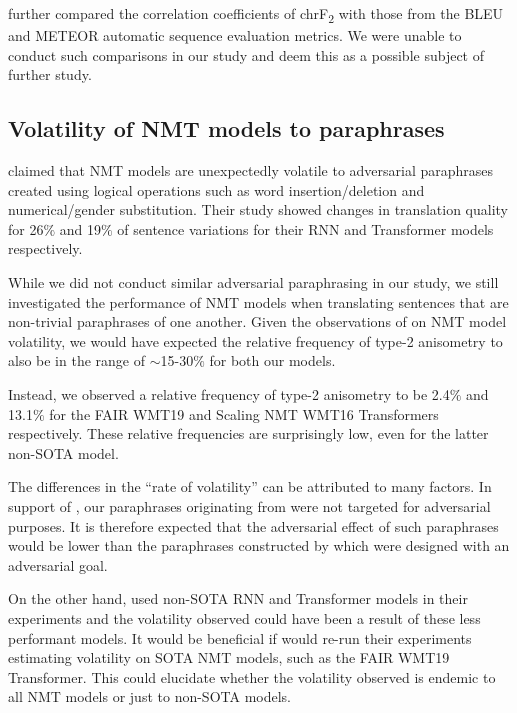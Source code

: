 \documentclass[11pt,a4paper]{article}
\begin{document}
\citet{michel2019evaluation} further compared the correlation coefficients of chrF\textsubscript{2} with those from the BLEU \cite{papineni2002bleu} and METEOR \cite{denkowski2014meteor} automatic sequence evaluation metrics. We were unable to conduct such comparisons in our study and deem this as a possible subject of further study. 

\subsection{Volatility of NMT models to paraphrases}

\citet{fadaee2020unreasonable} claimed that NMT models are unexpectedly volatile to adversarial paraphrases created using logical operations such as word insertion/deletion and numerical/gender substitution. Their study showed changes in translation quality for 26$\%$ and 19$\%$ of sentence variations for their RNN and Transformer models respectively.

While we did not conduct similar adversarial paraphrasing in our study, we still investigated the performance of NMT models when translating sentences that are non-trivial paraphrases of one another. Given the observations of \citet{fadaee2020unreasonable} on NMT model volatility, we would have expected the relative frequency of type-2 anisometry to also be in the range of $\sim$15-30$\%$ for both our models.

Instead, we observed a relative frequency of type-2 anisometry to be 2.4$\%$ and 13.1$\%$ for the FAIR WMT19 and Scaling NMT WMT16 Transformers respectively. These relative frequencies are surprisingly low, even for the latter non-SOTA model.

The differences in the ``rate of volatility'' can be attributed to many factors. In support of \citet{fadaee2020unreasonable}, our paraphrases originating from \citet{freitag-bleu-paraphrase-references-2020} were not targeted for adversarial purposes. It is therefore expected that the adversarial effect of such paraphrases would be lower than the paraphrases constructed by \citet{fadaee2020unreasonable} which were designed with an adversarial goal.

On the other hand, \citet{fadaee2020unreasonable} used non-SOTA RNN and Transformer models in their experiments and the volatility observed could have been a result of these less performant models. It would be beneficial if \citet{fadaee2020unreasonable} would re-run their experiments estimating volatility on SOTA NMT models, such as the FAIR WMT19 Transformer. This could elucidate whether the volatility observed is endemic to all NMT models or just to non-SOTA models. 
\end{document}

